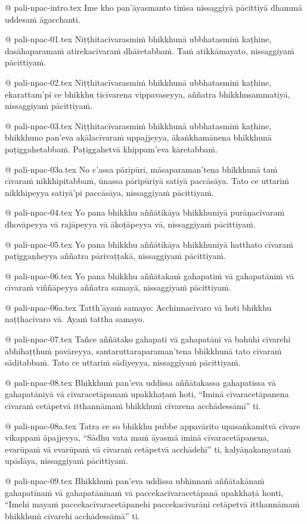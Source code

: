 @ pali-npac-intro.tex
Ime kho pan’āyasmanto tiṁsa nissaggiyā pācittiyā dhammā uddesaṁ āgacchanti.

@ pali-npac-01.tex
Niṭṭhitacīvarasmiṁ bhikkhunā ubbhatasmiṁ kaṭhine, dasāhaparamaṁ atirekacīvaraṁ dhāretabbaṁ. Taṁ atikkāmayato, nissaggiyaṁ pācittiyaṁ.

@ pali-npac-02.tex
Niṭṭhitacīvarasmiṁ bhikkhunā ubbhatasmiṁ kaṭhine, ekarattam’pi ce bhikkhu ticīvarena vippavaseyya, aññatra bhikkhusammatiyā, nissaggiyaṁ pācittiyaṁ.

@ pali-npac-03.tex
Niṭṭhitacīvarasmiṁ bhikkhunā ubbhatasmiṁ kaṭhine, bhikkhuno pan’eva akālacīvaraṁ uppajjeyya, ākaṅkhamānena bhikkhunā paṭiggahetabbaṁ. Paṭiggahetvā khippam’eva kāretabbaṁ. 

@ pali-npac-03a.tex
No c’assa pāripūri, māsaparaman’tena bhikkhunā taṁ cīvaraṁ nikkhipitabbaṁ, ūnassa pāripūriyā satiyā paccāsāya. Tato ce uttariṁ nikkhipeyya satiyā’pi paccāsāya, nissaggiyaṁ pācittiyaṁ.

@ pali-npac-04.tex
Yo pana bhikkhu aññātikāya bhikkhuniyā purāṇacīvaraṁ dhovāpeyya vā rajāpeyya vā ākoṭāpeyya vā, nissaggiyaṁ pācittiyaṁ.

@ pali-npac-05.tex
Yo pana bhikkhu aññātikāya bhikkhuniyā hatthato cīvaraṁ paṭiggaṇheyya aññatra pārivaṭṭakā, nissaggiyaṁ pācittiyaṁ.

@ pali-npac-06.tex
Yo pana bhikkhu aññātakaṁ gahapatiṁ vā gahapatāniṁ vā cīvaraṁ viññāpeyya aññatra samayā, nissaggiyaṁ pācittiyaṁ.

@ pali-npac-06a.tex
Tatth’āyaṁ samayo: Acchinnacīvaro vā hoti bhikkhu naṭṭhacīvaro vā. Ayaṁ tattha samayo.

@ pali-npac-07.tex
Tañce aññātako gahapati vā gahapatānī vā bahūhi cīvarehi abhihaṭṭhuṁ pavāreyya, santaruttaraparaman’tena bhikkhunā tato cīvaraṁ sāditabbaṁ. Tato ce uttariṁ sādiyeyya, nissaggiyaṁ pācittiyaṁ.

@ pali-npac-08.tex
Bhikkhuṁ pan’eva uddissa aññātakassa gahapatissa vā gahapatāniyā vā cīvaracetāpanaṁ upakkhaṭaṁ hoti, “Iminā cīvaracetāpanena cīvaraṁ cetāpetvā itthannāmaṁ bhikkhuṁ cīvarena acchādessāmī” ti.

@ pali-npac-08a.tex
Tatra ce so bhikkhu pubbe appavārito upasaṅkamitvā cīvare vikappaṁ āpajjeyya, “Sādhu vata maṁ āyasmā iminā cīvaracetāpanena, evarūpaṁ vā evarūpaṁ vā cīvaraṁ cetāpetvā acchādehī” ti, kalyāṇakamyataṁ upādāya, nissaggiyaṁ pācittiyaṁ.

@ pali-npac-09.tex
Bhikkhuṁ pan’eva uddissa ubhinnaṁ aññātakānaṁ gahapatīnaṁ vā gahapatānīnaṁ vā paccekacīvaracetāpanā upakkhaṭā honti, “Imehi mayaṁ paccekacīvaracetāpanehi paccekacīvarāni cetāpetvā itthannāmaṁ bhikkhuṁ cīvarehi acchādessāmā” ti.

